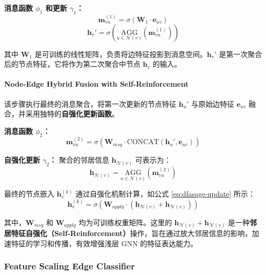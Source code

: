 \documentclass{article}
\begin{document}
\textbf{消息函数 $\phi_1$ 和更新 $\gamma_1$：}
$$
\mathbf{m}_{vu}^{(1)} = \sigma \left( \mathbf{W}_{1} \cdot
\mathbf{e}_{uv} \right)
$$
\begin{equation}
  \mathbf{h}_v' = \sigma \left( \underset{u \in
  \mathcal{N}(v)}{\text{AGG}} (\mathbf{m}_{vu}^{(1)}) \right)
\end{equation}

其中 $\mathbf{W}_{1}$ 是可训练的线性矩阵，负责将边特征投影到消息空间。$\mathbf{h}_v'$
是第一次聚合后的节点特征，它将作为第二次聚合中节点 $\mathbf{h}_v$ 的输入。

\paragraph{Node-Edge Hybrid Fusion with Self-Reinforcement}

该步骤执行最终的消息聚合，将第一次更新的节点特征 $\mathbf{h}_u'$ 与原始边特征 $\mathbf{e}_{uv}$
融合，并采用独特的\textbf{自强化更新函数}。

\textbf{消息函数 $\phi_2$：}
$$
\mathbf{m}_{vu}^{(2)} = \sigma \left( \mathbf{W}_{msg} \cdot
\text{CONCAT}(\mathbf{h}_u', \mathbf{e}_{uv}) \right)
$$

\textbf{自强化更新 $\gamma_2$：}
聚合的邻居信息 $\mathbf{h}_{\mathcal{N}(v)}$ 可表示为：
$$
\mathbf{h}_{\mathcal{N}(v)} = \underset{u \in
\mathcal{N}(v)}{\text{AGG}} (\mathbf{m}_{vu}^{(2)})
$$

最终的节点嵌入 $\mathbf{h}_v^{(k)}$ 通过自强化机制计算，如公式 \eqref{eq:dfasage-update} 所示：
\begin{equation}
  \mathbf{h}_v^{(k)} = \sigma \left( \mathbf{W}_{apply} \cdot
  (\mathbf{h}_{\mathcal{N}(v)} + \mathbf{h}_{\mathcal{N}(v)}) \right)
  \label{eq:dfasage-update}
\end{equation}

其中，$\mathbf{W}_{msg}$ 和 $\mathbf{W}_{apply}$ 均为可训练权重矩阵。这里的
$\mathbf{h}_{\mathcal{N}(v)} + \mathbf{h}_{\mathcal{N}(v)}$
是一种\textbf{邻居特征自强化（Self-Reinforcement）}操作，旨在通过放大邻居信息的影响，加速特征的学习和传播，有效增强浅层
GNN 的特征表达能力。


\subsubsection{Feature Scaling Edge Classifier}
\end{document}
